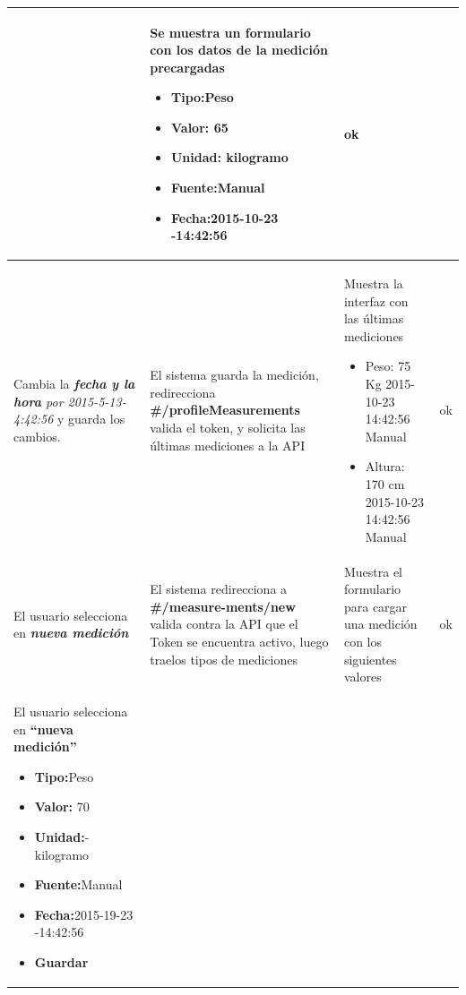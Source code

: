 \documentclass[a4paper,12pt]{article}
\begin{document}
\begin{longtable}{|p{4cm}|p{4cm}|p{4cm}|p{3cm}|}
& Se muestra un formulario con los datos de la medición precargadas
\begin{itemize}
	\item \textbf{Tipo:}Peso 
	\item \textbf{Valor: }65 
	\item \textbf{Unidad:} kilogramo
	\item \textbf{Fuente:}Manual 
	\item \textbf{Fecha:}2015-10-23 -14:42:56
\end{itemize}
&  ok
\\ \hline





Cambia la \textit{\textbf{fecha y la hora} por 2015-5-13- 4:42:56 }y guarda los cambios.
& El sistema guarda la medición, redirecciona\textbf{ \#/profileMeasurements }valida el token, y solicita las últimas mediciones a la API

& Muestra la interfaz con las últimas mediciones 
\begin{itemize}
	\item Peso: 75 Kg 2015-10-23 14:42:56 Manual 
	\item Altura: 170 cm 2015-10-23 14:42:56 Manual
\end{itemize}
& ok
\\ \hline





El usuario selecciona en \textit{\textbf{nueva medición}}
& El sistema redirecciona a \textbf{\#/measure-ments/new} valida contra la API que el Token se encuentra activo, luego traelos tipos de mediciones

& Muestra el formulario para cargar una medición con los siguientes valores 
\textbf{\begin{itemize}
	\item Tipo: 
	\item Valor:
	\item  Unidad: 
	\item Fuente: 
	\item Fecha:
\end{itemize}}
& ok
\\ \hline






El usuario selecciona en \textbf{``nueva medición''} 
\begin{itemize}
	\item \textbf{Tipo:}Peso
	\item \textbf{ Valor: }70
	\item\textbf{ Unidad:}-kilogramo
	\item \textbf{Fuente:}Manual
	\item \textbf{ Fecha:}2015-19-23 -14:42:56 
	\item \textbf{Guardar}
\end{itemize}


\end{longtable}
\end{document}
